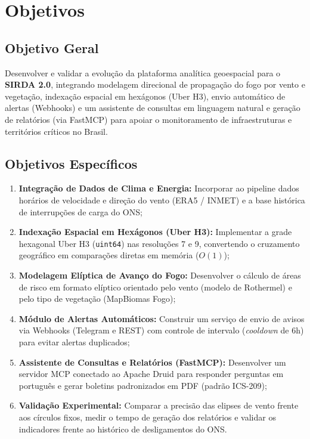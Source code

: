 \section{Objetivos}
\label{sc:objetivos}

\subsection{Objetivo Geral}
Desenvolver e validar a evolução da plataforma analítica geoespacial para o \textbf{SIRDA 2.0}, integrando modelagem direcional de propagação do fogo por vento e vegetação, indexação espacial em hexágonos (Uber H3), envio automático de alertas (Webhooks) e um assistente de consultas em linguagem natural e geração de relatórios (via FastMCP) para apoiar o monitoramento de infraestruturas e territórios críticos no Brasil.

\subsection{Objetivos Específicos}
\begin{enumerate}
    \setlength\itemsep{0em}
    \item \textbf{Integração de Dados de Clima e Energia:} Incorporar ao pipeline dados horários de velocidade e direção do vento (ERA5 / INMET) e a base histórica de interrupções de carga do ONS;
    \item \textbf{Indexação Espacial em Hexágonos (Uber H3):} Implementar a grade hexagonal Uber H3 (\texttt{uint64}) nas resoluções 7 e 9, convertendo o cruzamento geográfico em comparações diretas em memória ($O(1)$);
    \item \textbf{Modelagem Elíptica de Avanço do Fogo:} Desenvolver o cálculo de áreas de risco em formato elíptico orientado pelo vento (modelo de Rothermel) e pelo tipo de vegetação (MapBiomas Fogo);
    \item \textbf{Módulo de Alertas Automáticos:} Construir um serviço de envio de avisos via Webhooks (Telegram e REST) com controle de intervalo (\textit{cooldown} de 6h) para evitar alertas duplicados;
    \item \textbf{Assistente de Consultas e Relatórios (FastMCP):} Desenvolver um servidor MCP conectado ao Apache Druid para responder perguntas em português e gerar boletins padronizados em PDF (padrão ICS-209);
    \item \textbf{Validação Experimental:} Comparar a precisão das elipses de vento frente aos círculos fixos, medir o tempo de geração dos relatórios e validar os indicadores frente ao histórico de desligamentos do ONS.
\end{enumerate}
